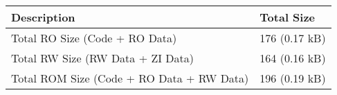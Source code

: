 \begin{tabular}{@{}ll@{}}
	\toprule
	\textbf{Description}                      & \textbf{Total Size} \\
	\midrule
	Total RO Size (Code + RO Data)            & 176 (0.17 kB)       \\
	Total RW Size (RW Data + ZI Data)         & 164 (0.16 kB)       \\
	Total ROM Size (Code + RO Data + RW Data) & 196 (0.19 kB)       \\
	\bottomrule
\end{tabular}
